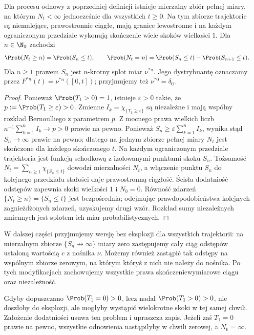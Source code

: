 \begin{twierdzenie}
Dla procesu odnowy z poprzedniej definicji istnieje
mierzalny zbiór pełnej miary, na którym $N_t<\infty$
jednocześnie dla wszystkich $t\ge0$. Na tym zbiorze
trajektorie są niemalejące, prawostronnie ciągłe,
mają granice lewostronne i na każdym ograniczonym
przedziale wykonują skończenie wiele skoków wielkości $1$.
Dla $n\in\N_0$ zachodzi
\[
\Prob(N_t\ge n)=\Prob(S_n\le t),\qquad
\Prob(N_t=n)=\Prob(S_n\le t)-\Prob(S_{n+1}\le t).
\]
Dla $n\ge1$ prawem $S_n$ jest $n$-krotny splot miar
$\nu^{*n}$. Jego dystrybuantę oznaczamy przez
$F^{*n}(t)=\nu^{*n}([0,t])$; przyjmujemy też
$\nu^{*0}=\delta_0$.
\end{twierdzenie}
\begin{proof}
Ponieważ $\Prob(T_1>0)=1$, istnieje $\varepsilon>0$
takie, że $p:=\Prob(T_1\ge\varepsilon)>0$.
Zmienne $I_k=\chi_{\{T_k\ge\varepsilon\}}$ są niezależne
i mają wspólny rozkład Bernoulliego z parametrem $p$.
Z mocnego prawa wielkich liczb
$n^{-1}\sum_{k=1}^n I_k\to p>0$ prawie na pewno.
Ponieważ $S_n\ge\varepsilon\sum_{k=1}^nI_k$, wynika stąd
$S_n\to\infty$ prawie na pewno; dlatego na jednym
zbiorze pełnej miary $N_t$ jest skończone dla każdego
skończonego $t$. Na każdym ograniczonym przedziale
trajektoria jest funkcją schodkową z izolowanymi
punktami skoku $S_n$. Tożsamość
$N_t=\sum_{n\ge1}\chi_{\{S_n\le t\}}$ dowodzi
mierzalności $N_t$, a włączenie punktu $S_n$
do kolejnego przedziału stałości daje prawostronną
ciągłość. Ścisła dodatniość odstępów zapewnia
skoki wielkości $1$ i $N_0=0$.
Równość zdarzeń $\{N_t\ge n\}=\{S_n\le t\}$ jest bezpośrednia;
odejmując prawdopodobieństwa kolejnych zagnieżdżonych zdarzeń,
uzyskujemy drugi wzór. Rozkład sumy niezależnych zmiennych
jest splotem ich miar probabilistycznych.
\end{proof}

W dalszej części przyjmujemy wersję bez eksplozji
dla wszystkich trajektorii: na mierzalnym zbiorze
$\{S_n\not\to\infty\}$ miary zero zastępujemy
cały ciąg odstępów ustaloną wartością $c$ z nośnika $\nu$.
Możemy również zastąpić tak odstępy na wspólnym
zbiorze zerowym, na którym któryś z nich nie należy
do nośnika. Po tych modyfikacjach zachowujemy wszystkie
prawa skończeniewymiarowe ciągu oraz niezależność.

\begin{uwaga}
Gdyby dopuszczano $\Prob(T_1=0)>0$, lecz nadal
$\Prob(T_1>0)>0$, nie doszłoby do eksplozji, ale mogłyby
wystąpić wielokrotne skoki w tej samej chwili.
Założenie dodatniości usuwa ten problem i upraszcza zapis.
Jeżeli zaś $T_1=0$ prawie na pewno, wszystkie odnowienia
nastąpiłyby w chwili zerowej, a $N_0=\infty$.
\end{uwaga}

